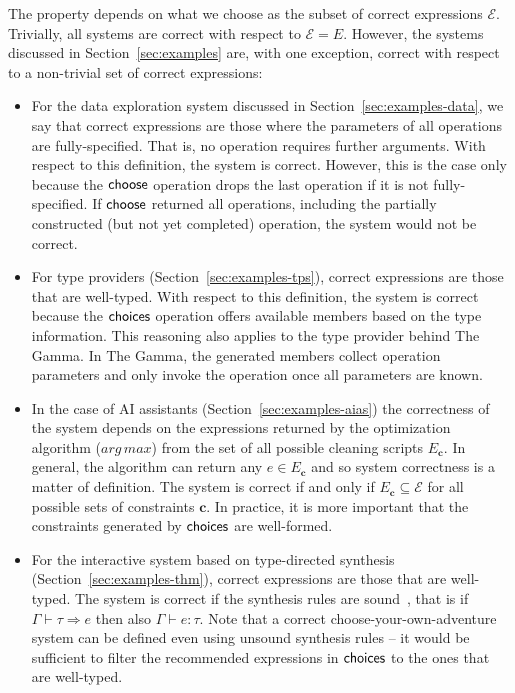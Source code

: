 \documentclass[a4paper,UKenglish,cleveref, autoref, thm-restate]{lipics-v2021}
\newcommand{\ident}[1]{\textsf{#1}}
\newcommand{\select}{\textnormal{\ident{choose}}}
\newcommand{\choices}{\textnormal{\ident{choices}}}
\begin{document}
The property depends on what we choose as the subset of correct expressions
$\mathcal{E}$. Trivially, all systems are correct with respect to $\mathcal{E}=E$.
However, the systems discussed in Section~\ref{sec:examples} are, with one exception,
correct with respect to a non-trivial set of correct expressions:

\begin{itemize}
\setlength{\itemsep}{5pt}
\item For the data exploration system discussed in Section~\ref{sec:examples-data}, we say that
  correct expressions are those where the parameters of all operations are fully-specified.
  That is, no operation requires further arguments. With respect to this definition,
  the system is correct. However, this is the case only because the $\select$ operation drops the last
  operation if it is not fully-specified. If $\select$ returned all operations, including the
  partially constructed (but not yet completed) operation, the system would not be correct.

\item For type providers (Section~\ref{sec:examples-tps}), correct expressions are those that
  are well-typed. With respect to this definition, the system is correct because the $\choices$
  operation offers available members based on the type information. This reasoning also applies to the
  type provider behind The Gamma. In The Gamma, the generated members collect operation parameters
  and only invoke the operation once all parameters are known.

\item In the case of AI assistants (Section~\ref{sec:examples-aias}) the correctness of the system
  depends on the expressions returned by the optimization algorithm ($\mathit{arg\,max}$) from the
  set of all possible cleaning scripts $E_{\boldsymbol{c}}$. In general, the algorithm can return
  any $e\in E_{\boldsymbol{c}}$ and so system correctness is a matter of definition. The system
  is correct if and only if $E_{\boldsymbol{c}}\subseteq\mathcal{E}$ for all possible sets of
  constraints $\boldsymbol{c}$. In practice, it is more important that the constraints generated
  by $\choices$ are well-formed.

\item For the interactive system based on type-directed synthesis (Section~\ref{sec:examples-thm}),
  correct expressions are those that are well-typed. The system is correct if the synthesis rules
  are sound~\cite{osera-2015-synthesis}, that is if $\Gamma \vdash \tau \Rightarrow e$ then also
  $\Gamma \vdash e : \tau$. Note that a correct choose-your-own-adventure system can be defined
  even using unsound synthesis rules -- it would be sufficient to filter the recommended
  expressions in $\choices$ to the ones that are well-typed.
\end{itemize}
\end{document}
